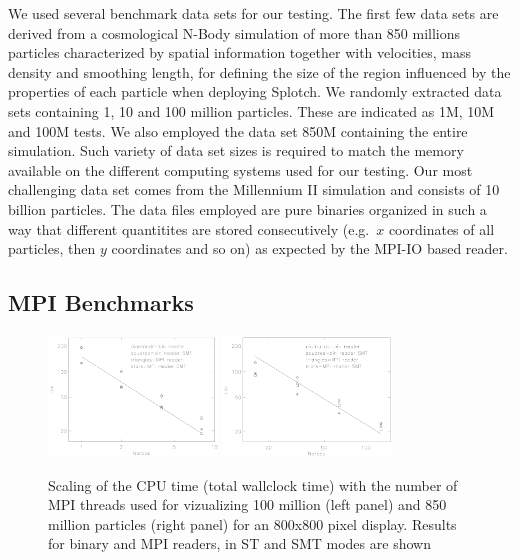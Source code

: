 \documentclass[1p,times]{elsarticle}
\begin{document}
We used several benchmark data sets for our testing. The first
few data sets are derived from a cosmological N-Body simulation of more than 850 millions
particles characterized by spatial information together with velocities, mass density 
and smoothing length, for defining the size of the region influenced by the properties 
of each particle when deploying Splotch. We randomly extracted data sets containing
1, 10 and 100 million particles. These are indicated as 1M, 
10M and 100M tests. We also employed the data set 850M containing the entire simulation.
Such variety of data set sizes is required to match the memory available on
the different computing systems used for our testing.
Our most challenging data set comes from the Millennium II simulation \cite{2009MNRAS.398.1150B}
and consists of 10 billion particles. The data files employed are pure binaries organized in such a way that different
quantitites are stored consecutively (e.g.\ $x$ coordinates of all particles, then $y$ coordinates and so on) as expected by the MPI-IO based reader. 

\subsection{MPI Benchmarks}

\begin{figure}
\begin{center}
\includegraphics[width=0.40\textwidth]{bench100M_r.pdf}
\includegraphics[width=0.40\textwidth]{bench870M_r.pdf}
\end{center}
\caption{Scaling of the CPU time (total wallclock time) with the number of MPI threads 
used for vizualizing 100 million (left panel)
and 850 million particles (right panel) for an 800x800 pixel display.
Results for binary and MPI readers, in ST and SMT modes are shown}\label{mpi100M}
\end{figure}
\end{document}
